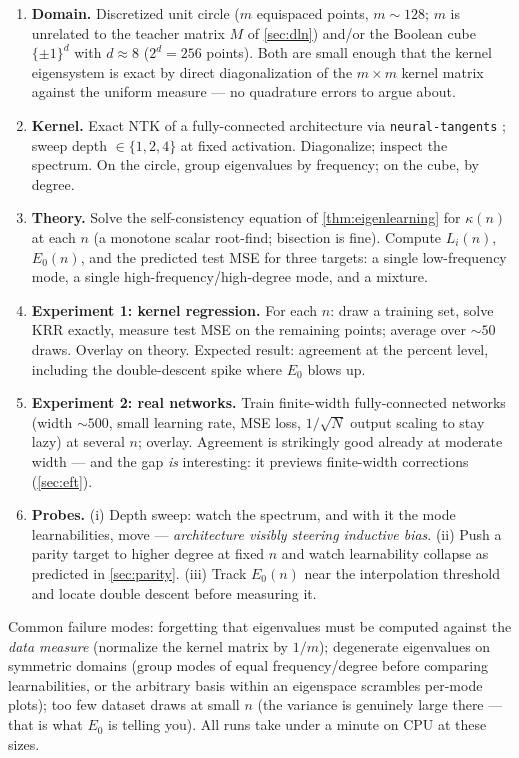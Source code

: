 \documentclass[11pt]{article}
\begin{document}
\begin{enumerate}
  \item \textbf{Domain.} Discretized unit circle ($m$ equispaced points,
  $m \sim 128$; $m$ is unrelated to the teacher matrix $M$ of \cref{sec:dln}) and/or the Boolean cube $\{\pm 1\}^d$ with $d \approx 8$
  ($2^d = 256$ points). Both are small enough that the kernel eigensystem is
  exact by direct diagonalization of the $m \times m$ kernel matrix against
  the uniform measure --- no quadrature errors to argue about.
  \item \textbf{Kernel.} Exact NTK of a fully-connected architecture via
  \texttt{neural-tangents} \cite{novak2020neural}; sweep depth
  $\in \{1, 2, 4\}$ at fixed activation. Diagonalize; inspect the spectrum.
  On the circle, group eigenvalues by frequency; on the cube, by degree.
  \item \textbf{Theory.} Solve the self-consistency equation of
  \cref{thm:eigenlearning} for $\kappa(n)$ at each $n$ (a monotone scalar
  root-find; bisection is fine). Compute $L_i(n)$, $E_0(n)$, and the
  predicted test MSE for three targets: a single low-frequency mode, a
  single high-frequency/high-degree mode, and a mixture.
  \item \textbf{Experiment 1: kernel regression.} For each $n$: draw a
  training set, solve KRR exactly, measure test MSE on the remaining
  points; average over $\sim 50$ draws. Overlay on theory. Expected result:
  agreement at the percent level, including the double-descent spike where
  $E_0$ blows up.
  \item \textbf{Experiment 2: real networks.} Train finite-width
  fully-connected networks (width $\sim 500$, small learning rate, MSE
  loss, $1/\sqrt{N}$ output scaling to stay lazy) at several $n$; overlay.
  Agreement is strikingly good already at moderate width --- and the gap
  \emph{is} interesting: it previews finite-width corrections
  (\cref{sec:eft}).
  \item \textbf{Probes.} (i) Depth sweep: watch the spectrum, and with it
  the mode learnabilities, move --- \emph{architecture visibly steering
  inductive bias}. (ii) Push a parity target to higher degree at fixed $n$
  and watch learnability collapse as predicted in \cref{sec:parity}.
  (iii) Track $E_0(n)$ near the interpolation threshold and locate double
  descent before measuring it.
\end{enumerate}

\begin{callout}[warning]
Common failure modes: forgetting that eigenvalues must be computed against
the \emph{data measure} (normalize the kernel matrix by $1/m$); degenerate
eigenvalues on symmetric domains (group modes of equal frequency/degree
before comparing learnabilities, or the arbitrary basis within an eigenspace
scrambles per-mode plots); too few dataset draws at small $n$ (the variance
is genuinely large there --- that is what $E_0$ is telling you). All runs
take under a minute on CPU at these sizes.
\end{callout}
\end{document}
